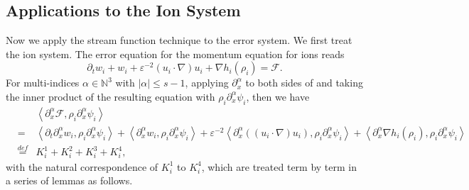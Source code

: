 \documentclass[reqno,twoside,12pt,a4paper]{amsart}
\newcommand{\N}{\mathbb{N}}
\newcommand{\eps}{\mathbb{\varepsilon}}
\newcommand{\al}{\alpha}
\newcommand{\pa}{\partial}
\newcommand{\calf}{\mathcal{F}}
\numberwithin{equation}{section}
\begin{document}
\subsection*{Applications to the Ion System} Now we apply the stream function technique to the error system. We first treat the ion system. The error equation for the momentum equation for ions reads
\[
\partial_t w_i+w_i+\eps^{-2}(u_i \cdot \nabla) u_i+\nabla h_i(\rho_i)=\mathcal{F}.
\]
For multi-indices $\al\in\N^3$ with $|\al|\leq s-1$, applying $\partial^\al_x$ to both sides of and taking the inner product of the resulting equation with $\rho_i \partial^\al_x \psi_i$, then we have
\begin{eqnarray*}
    &&\left\langle \pa_x^\al \calf, \rho_i \partial^\al_x \psi_i\right\rangle\nonumber\\
    & =&\left\langle \partial_t \partial^\al_x w_i, \rho_i \partial^\al_x \psi_i \right\rangle + \left\langle \partial^\al_x w_i, \rho_i \partial^\al_x \psi_i \right\rangle+ \eps^{-2} \left\langle \partial^\al_x ((u_i \cdot \nabla) u_i), \rho_i \partial^\al_x \psi_i \right\rangle + \left\langle \partial^\al_x \nabla h_i(\rho_i), \rho_i \partial^\al_x \psi_i \right\rangle\nonumber\\
    & \overset{def}{=}&K_i^1+K_i^2+K_i^3+K_i^4,
\end{eqnarray*}
with the natural correspondence of $K_i^1$ to $K_i^4$, which are treated term by term in a series of lemmas as follows. 
\end{document}

